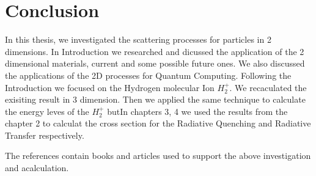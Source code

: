 \chapter{Conclusion}
\label{conclusion}

In this thesis, we investigated the scattering processes for particles in 2 dimensions. In Introduction we researched and dicussed the application of the 2 dimensional materials, current and some possible future ones. We also discussed the applications of the 2D processes for Quantum Computing.
Following the Introduction we focused on the Hydrogen molecular Ion $ H_2^{+} $. We recaculated the exisiting result in 3 dimension. 
Then we applied the same technique to calculate the energy leves of the $ H_2^{+} $ butIn chapters 3, 4 we used the results from the chapter 2 to calculat the cross section for the Radiative Quenching and Radiative Transfer respectively.

The references contain books and articles used to support the above investigation and acalculation.



